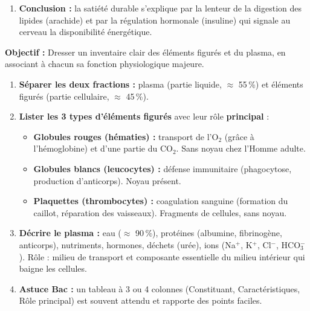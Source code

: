 \documentclass[11pt]{article}
\newcommand{\cle}[1]{{\popxbold\color{popdark}#1}}
\begin{document}
\begin{exoresolu}
\begin{enumerate}
\begin{itemize}
                \item \textbf{Acides gras :} stockés dans le \textbf{tissu adipeux} (réserve à long terme). Utilisés comme source d'énergie par le muscle au repos et le cœur. Entrent dans la composition des \textbf{membranes cellulaires}.
                \item \textbf{Acides aminés :} synthèse des \textbf{protéines structurales} (muscles), des \textbf{enzymes}, des \textbf{anticorps}, de l'\textbf{hémoglobine}.
            \end{itemize}
        \item \textbf{Conclusion :} la satiété durable s'explique par la lenteur de la digestion des lipides (arachide) et par la régulation hormonale (insuline) qui signale au cerveau la disponibilité énergétique.
    \end{enumerate}
\end{exoresolu}

\begin{methode}
    \textbf{Objectif :} Dresser un inventaire clair des éléments figurés et du plasma, en associant à chacun sa fonction physiologique majeure.
    \begin{enumerate}
        \item \textbf{Séparer les deux fractions :} \cle{plasma} (partie liquide, $\approx$ 55\,\%) et \cle{éléments figurés} (partie cellulaire, $\approx$ 45\,\%).
        \item \textbf{Lister les 3 types d'éléments figurés} avec leur rôle \textbf{principal} :
            \begin{itemize}
                \item \textbf{Globules rouges (hématies) :} transport de l'\cle{O$_2$} (grâce à l'hémoglobine) et d'une partie du CO$_2$. Sans noyau chez l'Homme adulte.
                \item \textbf{Globules blancs (leucocytes) :} \cle{défense immunitaire} (phagocytose, production d'anticorps). Noyau présent.
                \item \textbf{Plaquettes (thrombocytes) :} \cle{coagulation} sanguine (formation du caillot, réparation des vaisseaux). Fragments de cellules, sans noyau.
            \end{itemize}
        \item \textbf{Décrire le plasma :} eau ($\approx$ 90\,\%), protéines (albumine, fibrinogène, anticorps), nutriments, hormones, déchets (urée), ions (Na$^+$, K$^+$, Cl$^-$, HCO$_3^-$). Rôle : \cle{milieu de transport} et composante essentielle du \cle{milieu intérieur} qui baigne les cellules.
        \item \textbf{Astuce Bac :} un tableau à 3 ou 4 colonnes (Constituant, Caractéristiques, Rôle principal) est souvent attendu et rapporte des points faciles.
    \end{enumerate}
\end{methode}
\end{document}
